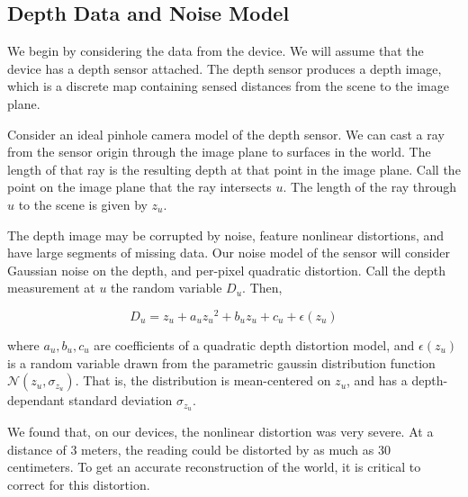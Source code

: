 \documentclass[conference,10pt]{IEEEtran}
\begin{document}
\subsection{Depth Data and Noise Model}
We begin by considering the data from the device. We will assume that the device
has a depth sensor attached. The depth sensor produces a depth image, which is
a discrete map containing sensed distances from the scene to the image plane.

Consider an ideal pinhole camera model of the depth sensor. We can cast a ray
from the sensor origin through the image plane to surfaces in the world. The
length of that ray is the resulting depth at that point in the image plane. Call
the point on the image plane that the ray intersects $u$. The length of the ray
through $u$ to the scene is given by $z_u$. 

The depth image may be corrupted by noise, feature nonlinear distortions, and
have large segments of missing data. Our noise model of the sensor will consider
Gaussian noise on the depth, and per-pixel quadratic distortion. Call the depth
 measurement at $u$ the random variable $D_u$. Then,
 
 $$ D_u = z_u + a_u{z_u}^2 + b_u z_u + c_u + \epsilon(z_u)$$
 
 \noindent where $a_u, b_u, c_u$ are coefficients of a quadratic depth
 distortion model, and $\epsilon(z_u)$ is a random variable drawn from the
 parametric gaussin distribution function $\mathcal{N}(z_u, \sigma_{z_u})$. 
 That is, the distribution is mean-centered on $z_u$, and has a depth-dependant
 standard deviation $\sigma_{z_u}$.
 
 We found that, on our devices, the nonlinear distortion was very severe. At a
distance of 3 meters, the reading could be distorted by as much as 30
centimeters. To get an accurate reconstruction of the world, it is critical to
correct for this distortion.
 
\end{document}
